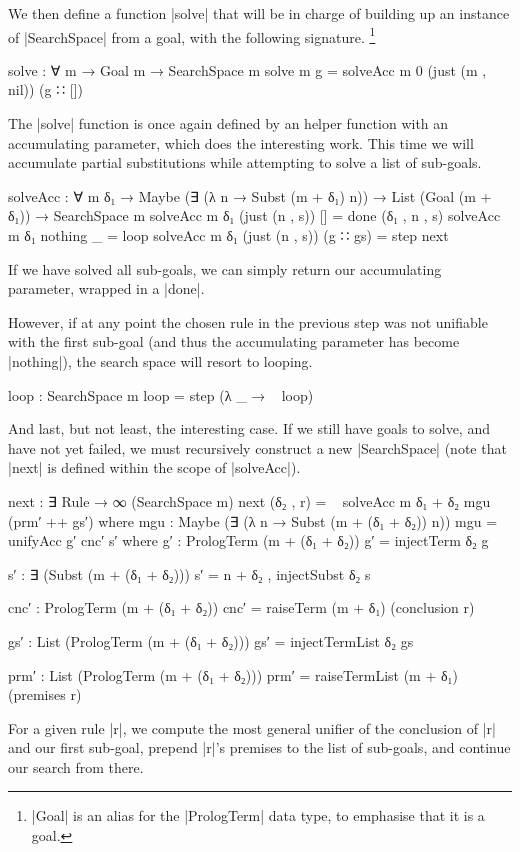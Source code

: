 \documentclass[preprint]{sigplanconf}
\begin{document}
We then define a function |solve| that will be in charge of building
up an instance of |SearchSpace| from a goal, with the following
signature.
\footnote{
  |Goal| is an alias for the |PrologTerm| data type, to emphasise that
  it is a goal.
}
\begin{code}
  solve : ∀ {m} → Goal m → SearchSpace m
  solve {m} g = solveAcc {m} {0} (just (m , nil)) (g ∷ [])
\end{code}
The |solve| function is once again defined by an helper function with
an accumulating parameter, which does the interesting work. This time
we will accumulate partial substitutions while attempting to solve a
list of sub-goals.
\begin{code}
  solveAcc  : ∀ {m δ₁} → Maybe (∃ (λ n → Subst (m + δ₁) n))
            → List (Goal (m + δ₁)) → SearchSpace m
  solveAcc {m} {δ₁}  (just (n , s))  []        = done (δ₁ , n , s)
  solveAcc {m} {δ₁}  nothing         _         = loop
  solveAcc {m} {δ₁}  (just (n , s))  (g ∷ gs)  = step next
\end{code}
If we have solved all sub-goals, we can simply return our
accumulating parameter, wrapped in a |done|.

However, if at any point the chosen rule in the previous step was not
unifiable with the first sub-goal (and thus the accumulating parameter
has become |nothing|), the search space will resort to looping.
\begin{code}
  loop : SearchSpace m
  loop = step (λ _ → ~ loop)
\end{code}

And last, but not least, the interesting case. If we still have goals
to solve, and have not yet failed, we must recursively construct a new
|SearchSpace| (note that |next| is defined within the scope of
|solveAcc|).
\begin{code}
  next : ∃ Rule → ∞ (SearchSpace m)
  next (δ₂ , r) = ~ solveAcc {m} {δ₁ + δ₂} mgu (prm′ ++ gs′)
    where
      mgu   : Maybe (∃ (λ n → Subst (m + (δ₁ + δ₂)) n))
      mgu   = unifyAcc g′ cnc′ s′
        where
          g′    : PrologTerm (m + (δ₁ + δ₂))
          g′    = injectTerm δ₂ g

          s′    : ∃ (Subst (m + (δ₁ + δ₂)))
          s′    = n + δ₂ , injectSubst δ₂ s

          cnc′  : PrologTerm (m + (δ₁ + δ₂))
          cnc′  = raiseTerm (m + δ₁) (conclusion r)

      gs′   : List (PrologTerm (m + (δ₁ + δ₂)))
      gs′   = injectTermList δ₂ gs

      prm′  : List (PrologTerm (m + (δ₁ + δ₂)))
      prm′  = raiseTermList (m + δ₁) (premises r)
\end{code}
For a given rule |r|, we compute the most general unifier of the
conclusion of |r| and our first sub-goal, prepend |r|'s premises to
the list of sub-goals, and continue our search from there.
\end{document}

